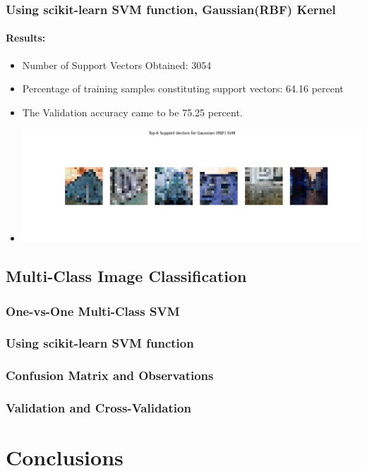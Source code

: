 \documentclass[12pt,a4paper]{article}
\begin{document}
\subsubsection{Using scikit-learn SVM function, Gaussian(RBF) Kernel}
\paragraph{Results:}
\begin{itemize}
    \item Number of Support Vectors Obtained: 3054
    \item Percentage of training samples constituting support vectors: 64.16 percent
    \item The Validation accuracy came to be 75.25 percent.
    \item \includegraphics[width=\textwidth]{Assignment 2/q2/top_6_support_vectors_rbf libsvm rbf.png}
\end{itemize}

\subsection{Multi-Class Image Classification}
\subsubsection{One-vs-One Multi-Class SVM}

\subsubsection{Using scikit-learn SVM function}

\subsubsection{Confusion Matrix and Observations}

\subsubsection{Validation and Cross-Validation}

\section*{Conclusions}
\end{document}
